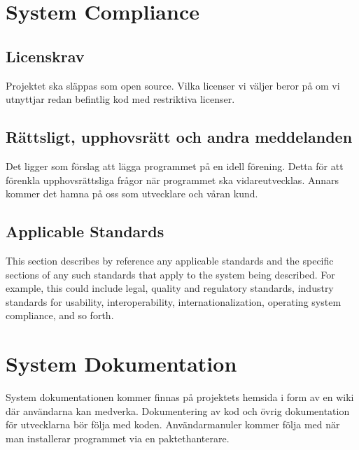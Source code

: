 \section{System Compliance}

\subsection{Licenskrav}
Projektet ska släppas som open source. Vilka licenser vi väljer beror på om vi utnyttjar redan befintlig kod med restriktiva licenser.

\subsection{Rättsligt, upphovsrätt och andra meddelanden}
Det ligger som förslag att lägga programmet på en idell förening. Detta för att förenkla upphovsrättsliga frågor när programmet ska vidareutvecklas. Annars kommer det hamna på oss som utvecklare och våran kund. 

\subsection{Applicable Standards}
This section describes by reference any applicable standards and the specific sections of any such standards that apply to the system being described. For example, this could include legal, quality and regulatory standards, industry standards for usability, interoperability, internationalization, operating system compliance, and so forth.

\section{System Dokumentation}
System dokumentationen kommer finnas på projektets hemsida i form av en wiki där användarna kan medverka. Dokumentering av kod och övrig dokumentation för utvecklarna bör följa med koden. Användarmanuler kommer följa med när man installerar programmet via en paktethanterare. %


